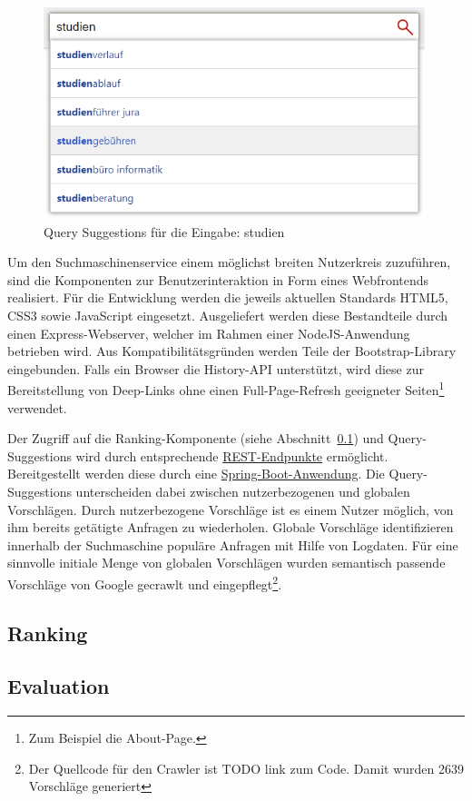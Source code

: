\begin{figure}[!ht]
	\includegraphics[width=0.99\textwidth]{chapter_query_processing/autocomplete.png}
	\caption{Query Suggestions für die Eingabe: \glqq studien\grqq}
	\label{fig:query_suggestions}
\end{figure}

Um den Suchmaschinenservice einem möglichst breiten Nutzerkreis zuzuführen, sind die
Komponenten zur Benutzerinteraktion in Form eines Webfrontends realisiert. Für die Entwicklung
werden die jeweils aktuellen Standards HTML5, CSS3 sowie JavaScript eingesetzt. 
Ausgeliefert werden diese Bestandteile durch einen Express-Webserver, welcher im Rahmen einer NodeJS-Anwendung betrieben wird.
Aus Kompatibilitätsgründen werden Teile der Bootstrap-Library eingebunden.
Falls ein Browser die History-API unterstützt, wird diese zur
Bereitstellung von Deep-Links ohne einen Full-Page-Refresh
geeigneter Seiten\footnote{Zum Beispiel die About-Page.} verwendet.

Der Zugriff auf die Ranking-Komponente (siehe Abschnitt~\ref{chap:ranking}) und Query-Suggestions wird durch
entsprechende \href{https://en.wikipedia.org/wiki/Representational_state_transfer}{REST-Endpunkte} ermöglicht.
Bereitgestellt werden diese durch eine \href{https://projects.spring.io/spring-boot/}{Spring-Boot-Anwendung}.
Die Query-Suggestions unterscheiden dabei zwischen nutzerbezogenen und globalen Vorschlägen.
Durch nutzerbezogene Vorschläge ist es einem Nutzer möglich, von ihm bereits getätigte Anfragen zu wiederholen.
Globale Vorschläge identifizieren innerhalb der Suchmaschine populäre Anfragen mit Hilfe von Logdaten.
Für eine sinnvolle initiale Menge von globalen Vorschlägen wurden semantisch passende
Vorschläge von Google gecrawlt und eingepflegt\footnote{Der Quellcode für den Crawler ist TODO link zum Code.
Damit wurden 2639 Vorschläge generiert}.


\subsection{Ranking~\cite{croft.chap2}}
\label{chap:ranking}



\subsection{Evaluation~\cite{croft.chap2}}
\label{chap:evaluation}

